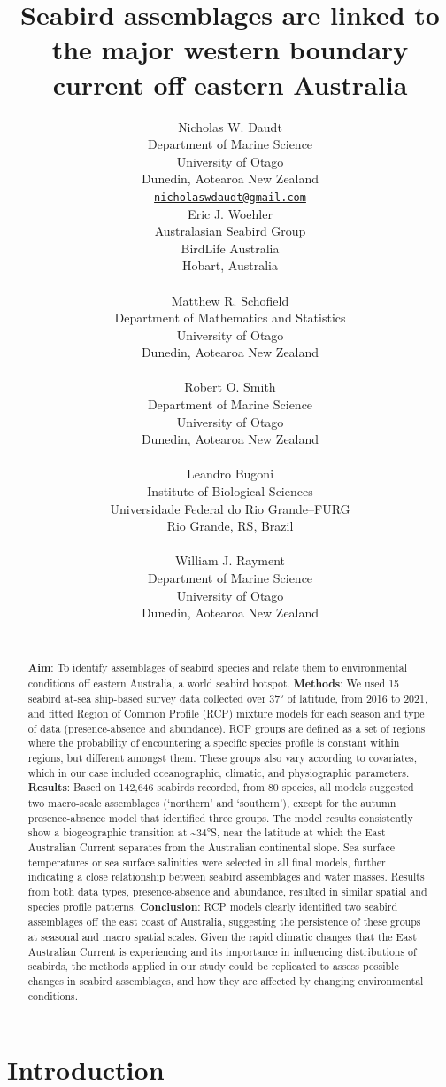 \documentclass{article}
\title{Seabird assemblages are linked to the major western boundary current off eastern Australia}
\author{
    Nicholas W. Daudt
   \\
    Department of Marine Science \\
    University of Otago \\
  Dunedin, Aotearoa New Zealand \\
  \texttt{\href{mailto:nicholaswdaudt@gmail.com}{\nolinkurl{nicholaswdaudt@gmail.com}}} \\
   \And
    Eric J. Woehler
   \\
    Australasian Seabird Group \\
    BirdLife Australia \\
  Hobart, Australia \\
  \texttt{} \\
   \And
    Matthew R. Schofield
   \\
    Department of Mathematics and Statistics \\
    University of Otago \\
  Dunedin, Aotearoa New Zealand \\
  \texttt{} \\
   \And
    Robert O. Smith
   \\
    Department of Marine Science \\
    University of Otago \\
  Dunedin, Aotearoa New Zealand \\
  \texttt{} \\
   \And
    Leandro Bugoni
   \\
    Institute of Biological Sciences \\
    Universidade Federal do Rio Grande--FURG \\
  Rio Grande, RS, Brazil \\
  \texttt{} \\
   \And
    William J. Rayment
   \\
    Department of Marine Science \\
    University of Otago \\
  Dunedin, Aotearoa New Zealand \\
  \texttt{} \\
  }
\begin{document}
\maketitle


\begin{abstract}
\textbf{Aim}: To identify assemblages of seabird species and relate them to environmental conditions off eastern Australia, a world seabird hotspot.
\textbf{Methods}: We used 15 seabird at-sea ship-based survey data collected over 37° of latitude, from 2016 to 2021, and fitted Region of Common Profile (RCP) mixture models for each season and type of data (presence-absence and abundance). RCP groups are defined as a set of regions where the probability of encountering a specific species profile is constant within regions, but different amongst them. These groups also vary according to covariates, which in our case included oceanographic, climatic, and physiographic parameters.
\textbf{Results}: Based on 142,646 seabirds recorded, from 80 species, all models suggested two macro-scale assemblages (`northern' and `southern'), except for the autumn presence-absence model that identified three groups. The model results consistently show a biogeographic transition at \textasciitilde34°S, near the latitude at which the East Australian Current separates from the Australian continental slope. Sea surface temperatures or sea surface salinities were selected in all final models, further indicating a close relationship between seabird assemblages and water masses. Results from both data types, presence-absence and abundance, resulted in similar spatial and species profile patterns.
\textbf{Conclusion}: RCP models clearly identified two seabird assemblages off the east coast of Australia, suggesting the persistence of these groups at seasonal and macro spatial scales. Given the rapid climatic changes that the East Australian Current is experiencing and its importance in influencing distributions of seabirds, the methods applied in our study could be replicated to assess possible changes in seabird assemblages, and how they are affected by changing environmental conditions.
\end{abstract}


\hypertarget{introduction}{%
\section{Introduction}\label{introduction}}
\end{document}
